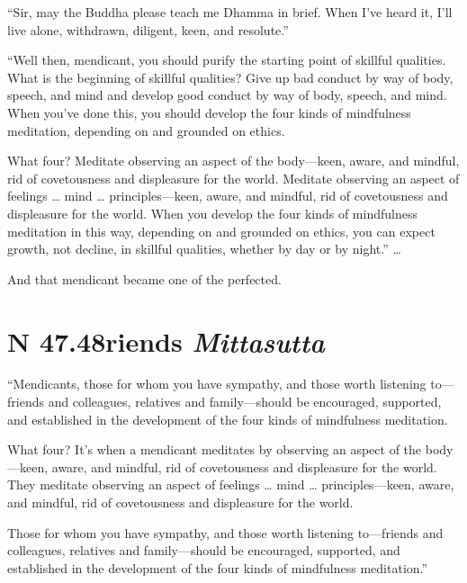 \documentclass[12pt,openany]{book}%
\newcommand*{\suttatitleacronym}[1]{\smaller[2]{#1}\vspace*{.3em}}
\newcommand*{\suttatitletranslation}[1]{\linebreak{#1}}
\newcommand*{\suttatitleroot}[1]{\linebreak\smaller[2]\itshape{#1}}
\newcommand*{\tocacronym}[1]{\hspace*{-3.3em}{#1}\quad}
\newcommand*{\toctranslation}[1]{#1}
\newcommand*{\tocroot}[1]{(\textit{#1})}
\begin{document}
“Sir, may the Buddha please teach me Dhamma in brief. When I’ve heard it, I’ll live alone, withdrawn, diligent, keen, and resolute.” 

“Well then, mendicant, you should purify the starting point of skillful qualities. What is the beginning of skillful qualities? Give up bad conduct by way of body, speech, and mind and develop good conduct by way of body, speech, and mind. When you’ve done this, you should develop the four kinds of mindfulness meditation, depending on and grounded on ethics. 

What four? Meditate observing an aspect of the body—keen, aware, and mindful, rid of covetousness and displeasure for the world. Meditate observing an aspect of feelings … mind … principles—keen, aware, and mindful, rid of covetousness and displeasure for the world. When you develop the four kinds of mindfulness meditation in this way, depending on and grounded on ethics, you can expect growth, not decline, in skillful qualities, whether by day or by night.” … 

And that mendicant became one of the perfected. 

%
\section*{{\suttatitleacronym SN 47.48}{\suttatitletranslation Friends }{\suttatitleroot Mittasutta}}
\addcontentsline{toc}{section}{\tocacronym{SN 47.48} \toctranslation{Friends } \tocroot{Mittasutta}}

“Mendicants, those for whom you have sympathy, and those worth listening to—friends and colleagues, relatives and family—should be encouraged, supported, and established in the development of the four kinds of mindfulness meditation. 

What four? It’s when a mendicant meditates by observing an aspect of the body—keen, aware, and mindful, rid of covetousness and displeasure for the world. They meditate observing an aspect of feelings … mind … principles—keen, aware, and mindful, rid of covetousness and displeasure for the world. 

Those for whom you have sympathy, and those worth listening to—friends and colleagues, relatives and family—should be encouraged, supported, and established in the development of the four kinds of mindfulness meditation.” 
\end{document}
